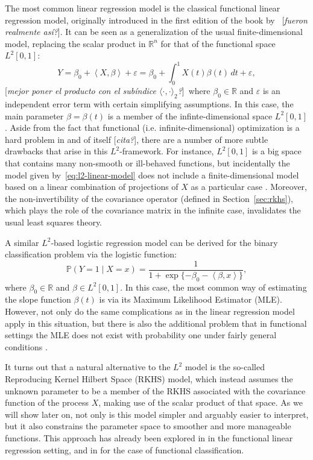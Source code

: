 \documentclass[ba]{imsart}
\numberwithin{equation}{section}
\theoremstyle{plain}
\renewcommand{\epsilon}{\varepsilon}
\newcommand{\R}{\mathbb{R}}
\newcommand\dotprod[2]{\left\langle #1, #2 \right\rangle}
\newcommand\incomment[1]{\color{red}[\textit{#1}]\color{black}}
\begin{document}
The most common linear regression model is the classical functional linear regression model, originally introduced in the first edition of the book by~\citet{ramsay2005functional} \incomment{fueron realmente así?}. It can be seen as a generalization of the usual finite-dimensional model, replacing the scalar product in \(\R^n\) for that of the functional space \(L^2[0,1]\):
\begin{equation}\label{eq:l2-linear-model}
Y = \beta_0 + \dotprod{X}{\beta} + \epsilon = \beta_0 + \int_0^1 X(t)\beta(t)\, dt + \epsilon,
\end{equation}
\incomment{mejor poner el producto con el subíndice \(\langle \cdot , \cdot \rangle_2\)?}~where \(\beta_0\in \R\) and \(\epsilon\) is an independent error term with certain simplifying assumptions. In this case, the main parameter \(\beta=\beta(t)\) is a member of the infinte-dimensional space \(L^2[0, 1]\). Aside from the fact that functional (i.e. infinite-dimensional) optimization is a hard problem in and of itself \incomment{cita?}, there are a number of more subtle drawbacks that arise in this \(L^2\)-framework. For instance, \(L^2[0, 1]\) is a big space that contains many non-smooth or ill-behaved functions, but incidentally the model given by~\eqref{eq:l2-linear-model} does not include a finite-dimensional model based on a linear combination of projections of \(X\) as a particular case \citep[see][]{berrendero2019rkhs}. Moreover, the non-invertibility of the covariance operator (defined in Section~\ref{sec:rkhs}), which plays the role of the covariance matrix in the infinite case, invalidates the usual least squares theory.

A similar \(L^2\)-based logistic regression model can be derived for the binary classification problem via the logistic function:
\begin{equation}\label{eq:l2-logistic-model}
  \mathbb P(Y=1 \mid X=x) = \frac{1}{1 + \exp\{-\beta_0 - \dotprod{\beta}{x}\}},
\end{equation}
where \(\beta_0 \in \R\) and \(\beta \in L^2[0, 1]\). In this case, the most common way of estimating the slope function \(\beta(t)\) is via its Maximum Likelihood Estimator (MLE). However, not only do the same complications as in the linear regression model apply in this situation, but there is also the additional problem that in functional settings the MLE does not exist with probability one under fairly general conditions \citep[see][p.~10]{buenolarraz2021functional}.

It turns out that a natural alternative to the \(L^2\) model is the so-called Reproducing Kernel Hilbert Space (RKHS) model, which instead assumes the unknown parameter to be a member of the RKHS associated with the covariance function of the process \(X\), making use of the scalar product of that space. As we will show later on, not only is this model simpler and arguably easier to interpret, but it also constrains the parameter space to smoother and more manageable functions. This approach has already been explored in \citet{berrendero2019rkhs} in the functional linear regression setting, and in \citet{berrendero2018use} for the case of functional classification.
\end{document}
